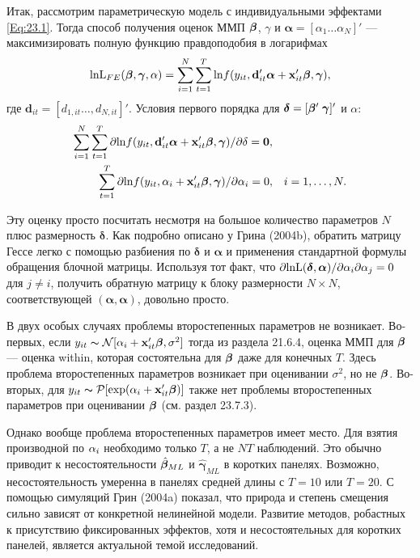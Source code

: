 Итак, рассмотрим параметрическую модель с индивидуальными эффектами \ref{Eq:23.1}. Тогда способ получения оценок ММП $\bm{\beta}$, $\gamma$ и  $\bm\alpha=[\alpha_1 \dots \alpha_N]'$ --- максимизировать полную функцию правдоподобия в логарифмах
\begin{align}
\mathrm{ln L}_{FE}(\bm{\beta},\bm\gamma,\alpha)=\sum^N_{i=1} \sum^T_{t=1} \mathrm{ln} f(y_{it}, \mathbf{d}'_{it} \bm\alpha + \mathbf{x}'_{it} \bm{\beta}, \bm\gamma),
\label{Eq:23.16}
\end{align}
где $\mathbf{d}_{it}=[d_{1,it} \dots, d_{N,it}]'$. Условия первого порядка для $\bm\delta = [\bm{\beta}' \; \bm\gamma]'$ и $\alpha$:
\begin{align}
\sum^N_{i=1} \sum^T_{t=1} \partial \mathrm{ln} f (y_{it}, \mathbf{d}'_{it}\bm\alpha + \mathbf{x}'_{it} \bm{\beta}, \bm\gamma) / \partial \delta = \mathbf{0}, 
\nonumber \\
\sum^T_{t=1} \partial \mathrm{ln} f (y_{it}, \alpha_i + \mathbf{x}'_{it} \bm{\beta}, \bm\gamma) / \partial \alpha_i = 0,&
& i=1, \dots, N.
\nonumber
\end{align}

Эту оценку просто посчитать несмотря на  большое количество параметров $N$ плюс размерность $\bm\delta$. Как подробно описано у Грина (2004b), обратить матрицу Гессе легко с помощью разбиения по $\bm\delta$  и $\bm\alpha$  и применения стандартной формулы обращения блочной матрицы. Используя тот факт, что $\partial \mathrm{ln L}(\bm\delta, \bm\alpha)/\partial\alpha_i \partial\alpha_j=0$ для $j \neq i$,  получить обратную матрицу к блоку размерности $N \times N$, соответствующей $(\bm\alpha, \bm\alpha)$, довольно просто.


В двух особых случаях проблемы второстепенных параметров не возникает. Во-первых, если $y_{it} \thicksim \mathcal{N} [\alpha_i + \mathbf{x}'_{it}\bm{\beta}, \sigma^2]$ тогда из раздела 21.6.4, оценка ММП для $\bm{\beta}$  --- оценка within, которая состоятельна для $\bm{\beta}$ даже для конечных $T$. Здесь проблема второстепенных параметров возникает при оценивании $\sigma^2$, но не $\bm{\beta}$. Во-вторых, для $y_{it} \thicksim  \mathcal{P} [\exp (\alpha_i+\mathbf{x}'_{it}\bm{\beta})]$ также нет проблемы второстепенных параметров при оценивании $\bm{\beta}$ (см. раздел 23.7.3).

Однако вообще проблема второстепенных параметров имеет место. Для взятия производной по $\alpha_i$ необходимо только $T$, а не $NT$ наблюдений. Это обычно приводит к несостоятельности $\hat{\bm{\beta}}_{ML}$ и $\hat{\bm\gamma}_{ML}$ в коротких панелях. Возможно, несостоятельность умеренна в панелях средней длины с $T=10$ или $T=20$. С помощью симуляций Грин (2004a) показал, что природа и степень смещения сильно зависят от конкретной нелинейной модели. Развитие методов, робастных к присутствию фиксированных эффектов, хотя и несостоятельных для коротких панелей, является актуальной темой исследований.

